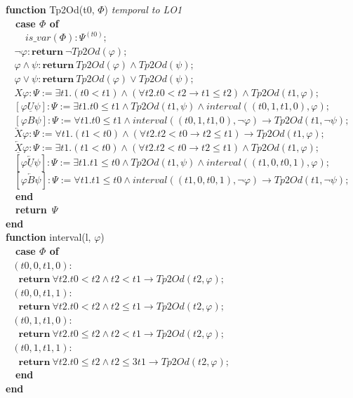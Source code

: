 \documentclass{article}
\begin{document}
\begin{multicols}{4}
\textbf{function} Tp2Od(t0, $\Phi$) \/\/\textit{temporal to LO1} \\
\ \ \textbf{case $\Phi$ of} \\
\ \ \ \ $is\_var(\Phi): \Psi^{(t0)};$ \\
$\ \ \ \ \neg \varphi : \textbf{return}\ \neg Tp2Od(\varphi); $ \\
$\ \ \ \ \varphi \wedge \psi : \textbf{return}\ Tp2Od(\varphi) \wedge Tp2Od(\psi); $ \\
$\ \ \ \ \varphi \vee \psi : \textbf{return}\ Tp2Od(\varphi) \vee Tp2Od(\psi); $ \\
$\ \ \ \ X\varphi : \Psi := \exists t1.(t0 < t1)\wedge(\forall t2.t0 < t2 \rightarrow t1 \leq t2) \wedge Tp2Od(t1, \varphi);$ \\
$\ \ \ \ [\varphi \underline{U} \psi] : \Psi := \exists t1.t0 \leq t1 \wedge Tp2Od(t1, \psi)\wedge interval((t0, 1, t1, 0), \varphi);$\\
$\ \ \ \ [\varphi B \psi] : \Psi := \forall t1.t0 \leq t1 \wedge interval((t0, 1, t1, 0), \neg\varphi) \rightarrow Tp2Od(t1, \neg\psi);$\\
$\ \ \ \ \overleftarrow{X}\varphi : \Psi := \forall t1.(t1 < t0)\wedge(\forall t2.t2 < t0 \rightarrow t2 \leq t1) \rightarrow Tp2Od(t1, \varphi);$ \\
$\ \ \ \ \overleftarrow{\underline{X}}\varphi : \Psi := \exists t1.(t1 < t0)\wedge(\forall t2.t2 < t0 \rightarrow t2 \leq t1) \wedge Tp2Od(t1, \varphi);$ \\
$\ \ \ \ [\varphi \overleftarrow{\underline{U}} \psi] : \Psi := \exists t1.t1 \leq t0 \wedge Tp2Od(t1, \psi)\wedge interval((t1, 0, t0, 1), \varphi);$\\
$\ \ \ \ [\varphi \overleftarrow{B} \psi] : \Psi := \forall t1.t1 \leq t0 \wedge interval((t1, 0, t0, 1), \neg\varphi) \rightarrow Tp2Od(t1, \neg\psi);$\\
\ \ \textbf{end} \\
\ \ \textbf{return}\ $\Psi$ \\
\textbf{end} \\

\textbf{function} interval(l, $\varphi$)\\
\ \ \textbf{case $\Phi$ of} \\
$\ \ \ (t0, 0, t1, 0) : $ \\
$\ \ \ \ \ \ \textbf{return}\ \forall t2.t0 < t2 \wedge t2 < t1 \rightarrow Tp2Od(t2, \varphi);$ \\
$\ \ \ (t0, 0, t1, 1) : $ \\
$\ \ \ \ \ \ \textbf{return}\ \forall t2.t0 < t2 \wedge t2 \leq t1 \rightarrow Tp2Od(t2, \varphi);$ \\
$\ \ \ (t0, 1, t1, 0) :$ \\
$\ \ \ \ \ \ \textbf{return}\ \forall t2.t0 \leq t2 \wedge t2 < t1 \rightarrow Tp2Od(t2, \varphi);$ \\
$\ \ \ (t0, 1, t1, 1) :$ \\
$\ \ \ \ \ \ \textbf{return}\ \forall t2.t0 \leq t2 \wedge t2 \leq3 t1 \rightarrow Tp2Od(t2, \varphi);$ \\
\ \ \textbf{end} \\
\textbf{end} \\


\end{multicols}
\end{document}
